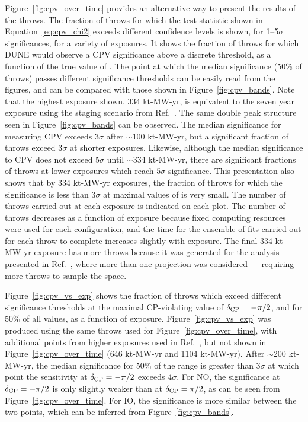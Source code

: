 Figure~\ref{fig:cpv_over_time} provides an alternative way to present the results of the throws. The fraction of throws for which the test statistic shown in Equation~\ref{eq:cpv_chi2} exceeds different confidence levels is shown, for 1--5$\sigma$ significances, for a variety of exposures. It shows the fraction of throws for which DUNE would observe a CPV significance above a discrete threshold, as a function of the true value of \deltacp. The point at which the median significance (50\% of throws) passes different significance thresholds can be easily read from the figures, and can be compared with those shown in Figure~\ref{fig:cpv_bands}. Note that the highest exposure shown, 334 kt-MW-yr, is equivalent to the seven year exposure using the staging scenario from Ref.~\cite{Abi:2020qib}. The same double peak structure seen in Figure~\ref{fig:cpv_bands} can be observed. The median significance for measuring CPV exceeds 3$\sigma$ after $\sim$100 kt-MW-yr, but a significant fraction of throws exceed 3$\sigma$ at shorter exposures. Likewise, although the median significance to CPV does not exceed 5$\sigma$ until $\sim$334 kt-MW-yr, there are significant fractions of throws at lower exposures which reach $5\sigma$ significance. This presentation also shows that by 334 kt-MW-yr exposures, the fraction of throws for which the significance is less than 3$\sigma$ at maximal values of \deltacp is very small. The number of throws carried out at each exposure is indicated on each plot. The number of throws decreases as a function of exposure because fixed computing resources were used for each configuration, and the time for the ensemble of fits carried out for each throw to complete increases slightly with exposure. The final 334 kt-MW-yr exposure has more throws because it was generated for the analysis presented in Ref.~\cite{Abi:2020qib}, where more than one projection was considered --- requiring more throws to sample the space.

Figure~\ref{fig:cpv_vs_exp} shows the fraction of throws which exceed different significance thresholds at the maximal CP-violating value of $\delta_{\rm CP} = -\pi/2$, and for 50\% of all \deltacp values, as a function of exposure. Figure~\ref{fig:cpv_vs_exp} was produced using the same throws used for Figure~\ref{fig:cpv_over_time}, with additional points from higher exposures used in Ref.~\cite{Abi:2020qib}, but not shown in Figure~\ref{fig:cpv_over_time} (646 kt-MW-yr and 1104 kt-MW-yr). After $\sim$200 kt-MW-yr, the median significance for 50\% of the \deltacp range is greater than 3$\sigma$ at which point the sensitivity at $\delta_{\rm CP} = -\pi/2$ exceeds 4$\sigma$. For NO, the significance at $\delta_{\rm CP} = -\pi/2$ is only slightly weaker than at $\delta_{\rm CP} = \pi/2$, as can be seen from Figure~\ref{fig:cpv_over_time}. For IO, the significance is more similar between the two points, which can be inferred from Figure~\ref{fig:cpv_bands}.

